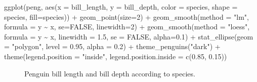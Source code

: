 \documentclass[
  letterpaper,
  10pt,
  krantz2]{krantz}
\makeatletter
\newenvironment{Shaded}{\begin{snugshade}}{\end{snugshade}}
\newcommand{\AttributeTok}[1]{\textcolor[rgb]{0.40,0.45,0.13}{#1}}
\newcommand{\ConstantTok}[1]{\textcolor[rgb]{0.56,0.35,0.01}{#1}}
\newcommand{\DecValTok}[1]{\textcolor[rgb]{0.68,0.00,0.00}{#1}}
\newcommand{\FloatTok}[1]{\textcolor[rgb]{0.68,0.00,0.00}{#1}}
\newcommand{\FunctionTok}[1]{\textcolor[rgb]{0.28,0.35,0.67}{#1}}
\newcommand{\NormalTok}[1]{\textcolor[rgb]{0.00,0.23,0.31}{#1}}
\newcommand{\SpecialCharTok}[1]{\textcolor[rgb]{0.37,0.37,0.37}{#1}}
\newcommand{\StringTok}[1]{\textcolor[rgb]{0.13,0.47,0.30}{#1}}
\newenvironment{kframe}{%
  \medskip{}
  \setlength{\fboxsep}{.8em}
  \def\at@end@of@kframe{}%
  \ifinner\ifhmode%
  \def\at@end@of@kframe{\end{minipage}}%
  \begin{minipage}{\columnwidth}%
  \fi\fi%
  \def\FrameCommand##1{\hskip\@totalleftmargin \hskip-\fboxsep
  \colorbox{shadecolor}{##1}\hskip-\fboxsep
      \hskip-\linewidth \hskip-\@totalleftmargin \hskip\columnwidth}%
  \MakeFramed {\advance\hsize-\width
    \@totalleftmargin\z@ \linewidth\hsize
    \@setminipage}}%
{\par\unskip\endMakeFramed%
  \at@end@of@kframe}
\renewenvironment{Shaded}{\begin{kframe}}{\end{kframe}}
\makeatother
\begin{document}
\begin{Shaded}
\begin{Highlighting}[]
\FunctionTok{ggplot}\NormalTok{(peng, }
       \FunctionTok{aes}\NormalTok{(}\AttributeTok{x =}\NormalTok{ bill\_length, }\AttributeTok{y =}\NormalTok{ bill\_depth,}
           \AttributeTok{color =}\NormalTok{ species, }\AttributeTok{shape =}\NormalTok{ species, }\AttributeTok{fill=}\NormalTok{species)) }\SpecialCharTok{+}
  \FunctionTok{geom\_point}\NormalTok{(}\AttributeTok{size=}\DecValTok{2}\NormalTok{) }\SpecialCharTok{+}
  \FunctionTok{geom\_smooth}\NormalTok{(}\AttributeTok{method =} \StringTok{"lm"}\NormalTok{, }\AttributeTok{formula =}\NormalTok{ y }\SpecialCharTok{\textasciitilde{}}\NormalTok{ x,}
              \AttributeTok{se=}\ConstantTok{FALSE}\NormalTok{, }\AttributeTok{linewidth=}\DecValTok{2}\NormalTok{) }\SpecialCharTok{+}
  \FunctionTok{geom\_smooth}\NormalTok{(}\AttributeTok{method =} \StringTok{"loess"}\NormalTok{,  }\AttributeTok{formula =}\NormalTok{ y }\SpecialCharTok{\textasciitilde{}}\NormalTok{ x,}
              \AttributeTok{linewidth =} \FloatTok{1.5}\NormalTok{, }\AttributeTok{se =} \ConstantTok{FALSE}\NormalTok{, }\AttributeTok{alpha=}\FloatTok{0.1}\NormalTok{) }\SpecialCharTok{+}
  \FunctionTok{stat\_ellipse}\NormalTok{(}\AttributeTok{geom =} \StringTok{"polygon"}\NormalTok{, }\AttributeTok{level =} \FloatTok{0.95}\NormalTok{, }\AttributeTok{alpha =} \FloatTok{0.2}\NormalTok{) }\SpecialCharTok{+}
  \FunctionTok{theme\_penguins}\NormalTok{(}\StringTok{"dark"}\NormalTok{) }\SpecialCharTok{+}
  \FunctionTok{theme}\NormalTok{(}\AttributeTok{legend.position =} \StringTok{"inside"}\NormalTok{,}
        \AttributeTok{legend.position.inside =} \FunctionTok{c}\NormalTok{(}\FloatTok{0.85}\NormalTok{, }\FloatTok{0.15}\NormalTok{))}
\end{Highlighting}
\end{Shaded}

\begin{figure}[H]


\caption{\label{fig-peng-ggplot1}Penguin bill length and bill depth
according to species.}

\end{figure}%
\end{document}
